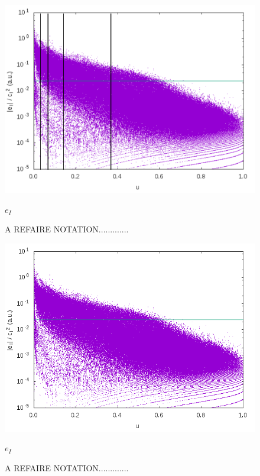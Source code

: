 \documentclass[./thesis.tex]{subfiles}
\begin{document}
\begin{figure}[h!]
	\begin{center}
		\includegraphics[width=0.9\columnwidth]{figures/pt2/eici2comb}
		\caption{A REFAIRE NOTATION.............}
		\label{fig:eici2comb}
		$e_I$
	\end{center}
\end{figure}



\begin{figure}[h!]
	\begin{center}
		\includegraphics[width=0.9\columnwidth]{figures/pt2/eici2}
		\caption{A REFAIRE NOTATION.............}
		\label{fig:eici2}
		$e_I$
	\end{center}
\end{figure}
\end{document}
